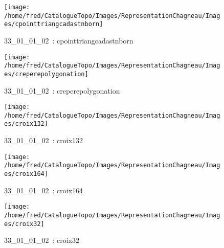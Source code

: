 \documentclass[12pt,titlepage]{book}
\begin{document}
\begin{figure}[h!]
\begin{minipage}[t]{3cm}
\begin{center}
    \end{center}
  \end{minipage}
  \begin{minipage}[t]{3cm}
    \begin{center}
      \texttt{[image: /home/fred/CatalogueTopo/Images/RepresentationChagneau/Images/cpointtriangcadastnborn]}
      \caption[~33\_01\_01\_02]{\small{33\_01\_01\_02~:} \tiny{cpointtriangcadastnborn}}\label{cpointtriangcadastnborn}
    \end{center}
  \end{minipage}
  \begin{minipage}[t]{3cm}
    \begin{center}
      \texttt{[image: /home/fred/CatalogueTopo/Images/RepresentationChagneau/Images/creperepolygonation]}
      \caption[~33\_01\_01\_02]{\small{33\_01\_01\_02~:} \tiny{creperepolygonation}}\label{creperepolygonation}
    \end{center}
  \end{minipage}
  \begin{minipage}[t]{3cm}
    \begin{center}
      \texttt{[image: /home/fred/CatalogueTopo/Images/RepresentationChagneau/Images/croix132]}
      \caption[~33\_01\_01\_02]{\small{33\_01\_01\_02~:} \tiny{croix132}}\label{croix132}
    \end{center}
  \end{minipage}
  \begin{minipage}[t]{3cm}
    \begin{center}
      \texttt{[image: /home/fred/CatalogueTopo/Images/RepresentationChagneau/Images/croix164]}
      \caption[~33\_01\_01\_02]{\small{33\_01\_01\_02~:} \tiny{croix164}}\label{croix164}
    \end{center}
  \end{minipage}
  \begin{minipage}[t]{3cm}
    \begin{center}
      \texttt{[image: /home/fred/CatalogueTopo/Images/RepresentationChagneau/Images/croix32]}
      \caption[~33\_01\_01\_02]{\small{33\_01\_01\_02~:} \tiny{croix32}}\label{croix32}
    \end{center}
  \end{minipage}
  \begin{minipage}[t]{3cm}

\end{minipage}
\end{figure}
\end{document}
